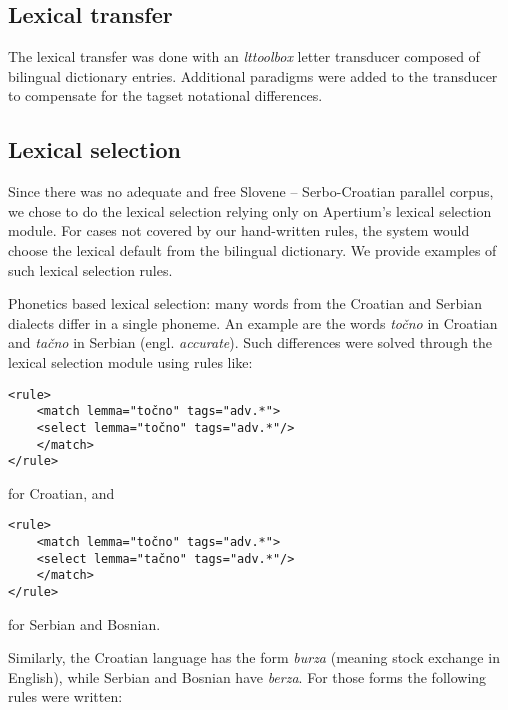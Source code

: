 \subsection{Lexical transfer}
The lexical transfer was done with an \emph{lttoolbox} letter
transducer composed of bilingual dictionary entries. Additional
paradigms were added to the transducer to compensate for the tagset
notational differences.

\subsection{Lexical selection}

Since there was no adequate and free Slovene -- Serbo-Croatian parallel corpus, 
we chose to do the lexical selection relying only on Apertium's lexical selection module.
For cases not covered by our hand-written rules, the system would choose the lexical 
default from the bilingual dictionary.
We provide examples of such lexical selection rules.

Phonetics based lexical selection: many words from the Croatian and Serbian dialects differ in a single phoneme.
An example are the words \emph{točno} in Croatian and \emph{tačno} in Serbian (engl. \emph{accurate}).
Such differences were solved through the lexical selection module using rules like:

{\small
\begin{Verbatim}
<rule>
    <match lemma="točno" tags="adv.*">
	<select lemma="točno" tags="adv.*"/>
    </match>
</rule>
\end{Verbatim}
}
for Croatian, and
{\small
\begin{Verbatim}
<rule>
    <match lemma="točno" tags="adv.*">
	<select lemma="tačno" tags="adv.*"/>
    </match>
</rule>
\end{Verbatim}
}
for Serbian and Bosnian.

Similarly, the Croatian language has the form \emph{burza} (meaning stock exchange in English), while Serbian and Bosnian have \emph{berza}. 
For those forms the following rules were written:

